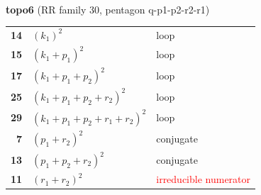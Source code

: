 \documentclass[10pt]{article}
\begin{document}
\begin{minipage}[t]{0.48\textwidth}
{}\\[2mm]\textbf{topo6} (RR family 30, pentagon q-p1-p2-r2-r1)\\[2pt]{\footnotesize\begin{tabular}{@{}r@{\ \ }l@{\ \ }l@{}}\textbf{14} & $(k_1)^2$ & loop\\
\textbf{15} & $(k_1+p_1)^2$ & loop\\
\textbf{17} & $(k_1+p_1+p_2)^2$ & loop\\
\textbf{25} & $(k_1+p_1+p_2+r_2)^2$ & loop\\
\textbf{29} & $(k_1+p_1+p_2+r_1+r_2)^2$ & loop\\
\textbf{7} & $(p_1+r_2)^2$ & conjugate\\
\textbf{13} & $(p_1+p_2+r_2)^2$ & conjugate\\
\textbf{11} & $(r_1+r_2)^2$ & \textcolor{red}{irreducible numerator}\\\end{tabular}}\end{minipage}

\bigskip
\end{document}
